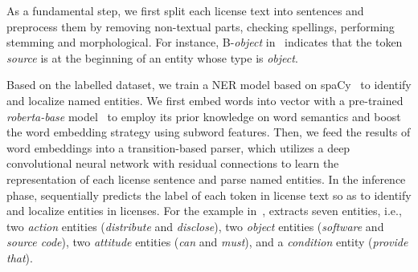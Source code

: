 As a fundamental step, we first split each license text into sentences and preprocess them by removing non-textual parts, checking spellings, performing stemming and morphological. For instance, B-\textit{object} in~ indicates that the token \textit{source} is at the beginning of an entity whose type is \textit{object}.

{Based on the labelled dataset, we train a NER model based on spaCy~\cite{spacy} to identify and localize named entities. 
We first embed words into vector with a pre-trained \textit{roberta-base} model~\cite{Liu2019RoBERTaAR} to employ its prior knowledge on word semantics and boost the word embedding strategy using subword features. 
Then, we feed the results of word embeddings into a transition-based parser, which utilizes a deep convolutional neural network with residual connections to learn the representation of each license sentence and parse named entities.
In the inference phase, \tool sequentially predicts the label of each token in license text so as to identify and localize entities in licenses.}
For the example in~, \tool extracts seven entities, i.e., two \textit{action} entities (\textit{distribute} and \textit{disclose}), two \textit{object} entities (\textit{software} and \textit{source code}), two \textit{attitude} entities (\textit{can} and \textit{must}), and a \textit{condition} entity (\textit{provide that}).



